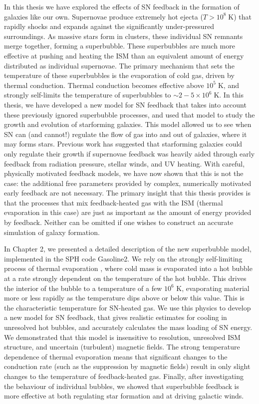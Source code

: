 In this thesis we have explored the effects of SN feedback in the formation of
galaxies like our own.  Supernovae produce extremely hot ejecta
($T>10^8\;\mathrm{K}$) that rapidly shocks and expands against the significantly
under-pressured surroundings.  As massive stars form in clusters, these
individual SN remnants merge together, forming a superbubble.  These
superbubbles are much more effective at pushing and heating the ISM than an
equivalent amount of energy distributed as individual supernovae.  The primary
mechanism that sets the temperature of these superbubbles is the evaporation of
cold gas, driven by thermal conduction.  Thermal conduction becomes effective
above $10^5\;\mathrm{K}$, and strongly self-limits the temperature of
superbubbles to $\sim2-5\times10^6\;\mathrm{K}$.  In this thesis, we have
developed a new model for SN feedback that takes into account these previously
ignored superbubble processes, and used that model to study the growth and
evolution of starforming galaxies.  This model allowed us to see when SN can
(and cannot!) regulate the flow of gas into and out of galaxies, where it may
forms stars.  Previous work \citep{Stinson2013,Hopkins2014} has suggested that
starforming galaxies could only regulate their growth if supernovae feedback was
heavily aided through early feedback from radiation pressure, stellar winds, and
UV heating.  With careful, physically motivated feedback models, we have now
shown that this is not the case:  the additional free parameters provided by
complex, numerically motivated early feedback are not necessary.  The primary
insight that this thesis provides is that the processes that mix feedback-heated
gas with the ISM (thermal evaporation in this case) are just as important as the
amount of energy provided by feedback.  Neither can be omitted if one wishes to
construct an accurate simulation of galaxy formation.  

In Chapter 2, we presented a detailed description of the new superbubble model,
implemented in the SPH code {\sc Gasoline2}.  We rely on the strongly
self-limiting process of thermal evaporation \citep{Cowie1977}, where cold mass
is evaporated into a hot bubble at a rate strongly dependent on the temperature
of the hot bubble. This drives the interior of the bubble to a temperature of a
few $10^6$ K, evaporating material more or less rapidly as the temperature dips
above or below this value.  This is the characteristic temperature for SN-heated
gas.  We use this physics to develop a new model for SN feedback, that gives
realistic estimates for cooling in unresolved hot bubbles, and accurately
calculates the mass loading of SN energy.  We demonstrated that this model is
insensitive to resolution, unresolved ISM structure, and uncertain (turbulent)
magnetic fields.  The strong temperature dependence of thermal evaporation means
that significant changes to the conduction rate (such as the suppression by
magnetic fields) result in only slight changes to the temperature of
feedback-heated gas.  Finally, after investigating the behaviour of individual
bubbles, we showed that superbubble feedback is more effective at both
regulating star formation and at driving galactic winds.

